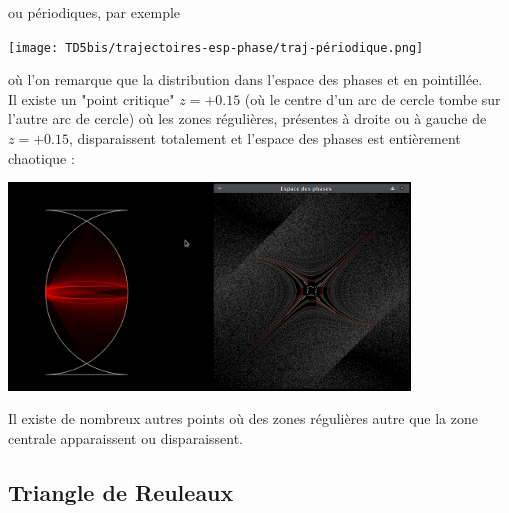 \documentclass{book}
\begin{document}
\begin{correction}
\begin{center}
\end{center}
ou périodiques, par exemple
\begin{center}
\texttt{[image: TD5bis/trajectoires-esp-phase/traj-périodique.png]}
\end{center}
où l'on remarque que la distribution dans l'espace des phases et en pointillée.\\
Il existe un "point critique" $z=+0.15$ (où le centre d'un arc de cercle tombe sur l'autre arc de cercle) où les zones régulières, présentes à droite ou à gauche de $z=+0.15$, disparaissent totalement et l'espace des phases est entièrement chaotique :
\begin{center}
\includegraphics[width=0.8\textwidth]{TD5bis/trajectoires-esp-phase/traj-at-z=0.15.png}
\end{center}
Il existe de nombreux autres points où des zones régulières autre que la zone centrale apparaissent ou disparaissent.

\end{correction}

\subsection{Triangle de Reuleaux}
\end{document}
